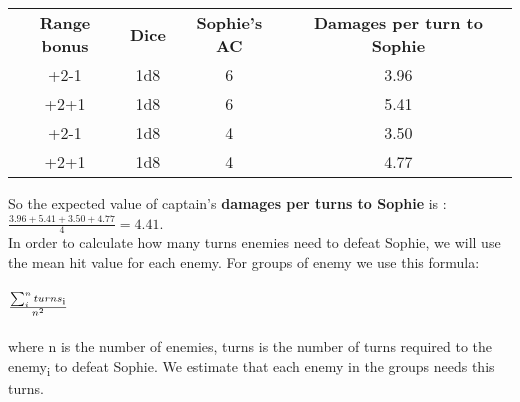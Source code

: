 \begin{table}[H]
  \centering
  \begin{tabular}{|c|c|c|c|}
    \hline
    \rowcolor[HTML]{9B9B9B}
    \multicolumn{4}{|c|}{\cellcolor[HTML]{9B9B9B}{\color[HTML]{FFFFFF} \textbf{Captain}}} \\ \hline
    \rowcolor[HTML]{C0C0C0}
    \textbf{Range bonus} & \textbf{Dice} & \textbf{Sophie's AC} & \textbf{Damages per turn to Sophie} \\ \hline
    +2-1 & 1d8 & 6 & 3.96 \\ \hline
    +2+1 & 1d8 & 6 & 5.41 \\ \hline
    +2-1 & 1d8 & 4 & 3.50 \\ \hline
    +2+1 & 1d8 & 4 & 4.77 \\ \hline
  \end{tabular}
\end{table}
So the expected value of captain's \textbf{damages per turns to Sophie} is :\\
$\frac{3.96+5.41+3.50+4.77}{4}=4.41$.\\
In order to calculate how many turns enemies need to defeat Sophie, we will use the mean hit value for each enemy. For groups of enemy we use this formula:\\\\
$\frac{\sum_{i}^{n}turns\textsubscript{i}}{n^2}$\\\\
where n is the number of enemies, turns is the number of turns required to the enemy\textsubscript{i} to defeat Sophie. We estimate that each enemy in the groups needs this turns.
\begin{table}[H]
\end{table}

